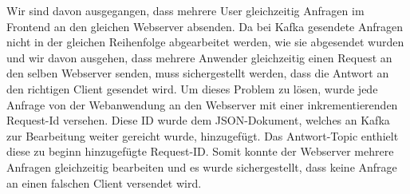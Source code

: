 Wir sind davon ausgegangen, dass mehrere User gleichzeitig Anfragen im Frontend an den gleichen Webserver absenden. Da bei Kafka gesendete Anfragen nicht in der gleichen Reihenfolge abgearbeitet werden, wie sie abgesendet wurden und wir davon ausgehen, dass mehrere Anwender gleichzeitig einen Request an den selben Webserver senden, muss sichergestellt werden, dass die Antwort an den richtigen Client gesendet wird. 
Um dieses Problem zu lösen, wurde jede Anfrage von der Webanwendung an den Webserver mit einer inkrementierenden Request-Id versehen.
Diese ID wurde dem JSON-Dokument, welches an Kafka zur Bearbeitung weiter gereicht wurde, hinzugefügt. Das Antwort-Topic enthielt diese zu beginn hinzugefügte Request-ID. Somit konnte der Webserver mehrere Anfragen gleichzeitig bearbeiten und es wurde sichergestellt, dass keine Anfrage an einen falschen Client versendet wird.
